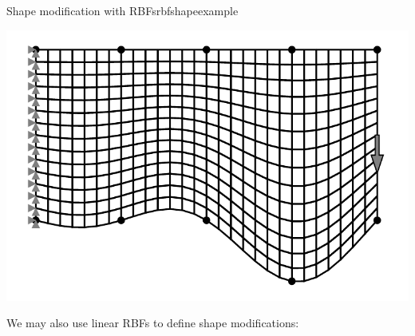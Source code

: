 \begin{example}{Shape modification with RBFs}{rbfshapeexample}
\begin{minipage}{.5\textwidth}
    \end{minipage}%
    \begin{minipage}{.5\textwidth}
        \centering
        \includegraphics[width=0.9\linewidth]{figures/cantilever_fem_shape_3.pdf}
    \end{minipage}
    We may also use linear RBFs to define shape modifications:
    

\end{example}
